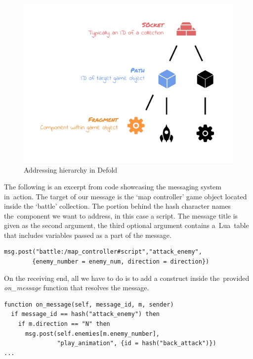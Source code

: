 \documentclass[thesis=B,english,hidelinks]{FITthesisXE}[2012/06/26]
\begin{document}
\begin{figure}[ht]
\centering
\includegraphics[scale=0.75]{defold_addressing}
\caption{Addressing hierarchy in Defold}
\label{fig:defold_addressing}
\end{figure}

\newpage

The following is an excerpt from code showcasing the messaging system in~action. The target of our message is the `map controller' game object located inside the `battle' collection. The portion behind the hash character names the~component we want to address, in this case a script. The message title is given as the second argument, the third optional argument contains a~Lua~table that includes variables passed as a part of the message\autocite{defoldmessaging}.

\begin{lstlisting}[language={[5.0]Lua}]
msg.post("battle:/map_controller#script","attack_enemy",
        {enemy_number = enemy_num, direction = direction})
\end{lstlisting}

On the receiving end, all we have to do is to add a construct inside the~provided \emph{on\_message} function that resolves the message.

\begin{lstlisting}[language={[5.0]Lua}]
function on_message(self, message_id, m, sender)
  if message_id == hash("attack_enemy") then
    if m.direction == "N" then
      msg.post(self.enemies[m.enemy_number],
               "play_animation", {id = hash("back_attack")})
...
\end{lstlisting}
\end{document}
